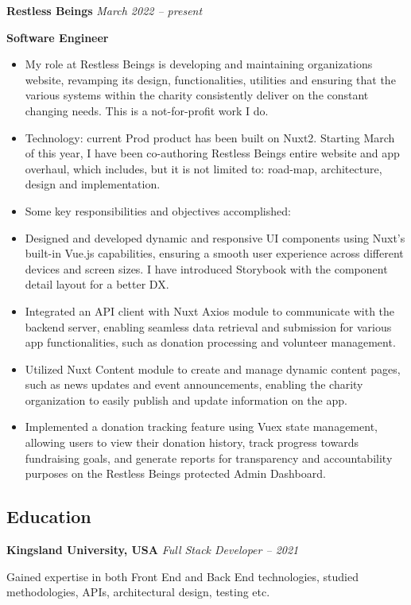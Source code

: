 \documentclass[11pt, oneside]{article}
\begin{document}
\medskip

\textbf{Restless Beings}
\hfill
\textit{March 2022 – present}

\textbf{Software Engineer}

\begin{itemize} 
  \item My role at Restless Beings is developing and maintaining organizations website, revamping its design, functionalities, utilities and ensuring that the various systems within the charity consistently deliver on the constant changing needs. This is a not-for-profit work I do.
  \item Technology: current Prod product has been built on Nuxt2. Starting March of this year, I have been co-authoring Restless Beings entire website and app overhaul, which includes, but it is not limited to: road-map, architecture, design and implementation.
  \item Some key responsibilities and objectives accomplished:
  \item Designed and developed dynamic and responsive UI components using Nuxt's built-in Vue.js capabilities, ensuring a smooth user experience across different devices and screen sizes. I have introduced Storybook with the component detail layout for a better DX.
  \item Integrated an API client with Nuxt Axios module to communicate with the backend server, enabling seamless data retrieval and submission for various app functionalities, such as donation processing and volunteer management.
  \item Utilized Nuxt Content module to create and manage dynamic content pages, such as news updates and event announcements, enabling the charity organization to easily publish and update information on the app.
  \item Implemented a donation tracking feature using Vuex state management, allowing users to view their donation history, track progress towards fundraising goals, and generate reports for transparency and accountability purposes on the Restless Beings protected Admin Dashboard.

\end{itemize}

\medskip

\subsection*{Education}
\textbf{Kingsland University, USA}
\hfill
\textit{Full Stack Developer – 2021}

Gained expertise in both Front End and Back End technologies, studied methodologies, APIs, architectural design, testing etc.
\end{document}
